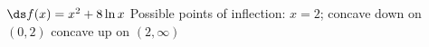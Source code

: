 {$\ds f(x) = x^2+8\ln x$
}
{Possible points of inflection: $x=2$;
concave down on $(0,2)$
concave up on $(2,\infty)$
}
